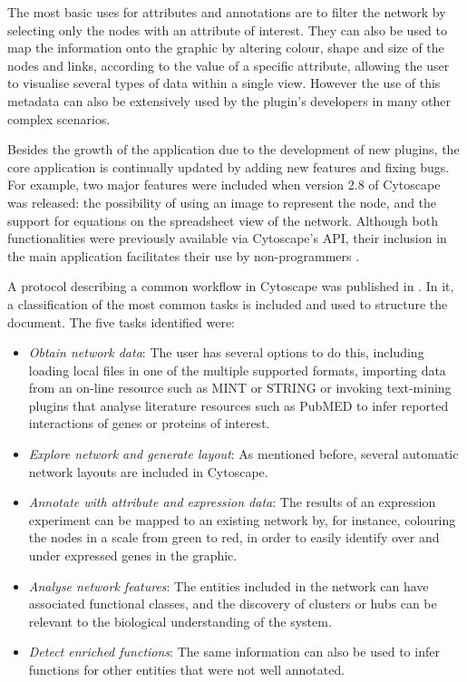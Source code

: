 The most basic uses for attributes and annotations are to filter the network by selecting only the nodes with an attribute of interest. They can also be used to map the information onto the graphic by altering colour, shape and size of the nodes and links, according to the value of a specific attribute, allowing the user to visualise several types of data within a single view. However the use of this metadata can also be extensively used by the plugin's developers in many other complex scenarios.

Besides the growth of the application due to the development of new plugins, the core application is continually updated by adding new features and fixing bugs. For example, two major features were included when version 2.8 of Cytoscape was released: the possibility of using an image to represent the node, and the support for equations on the spreadsheet view of the network. Although both functionalities were previously available via Cytoscape's API, their inclusion in the main application facilitates their use by non-programmers \cite{SMO2011}.

A protocol describing a common workflow in Cytoscape was published in \cite{CLI2007}. In it, a classification of the most common tasks is included and used to structure the document. The five tasks identified were: 
\begin{itemize}
\setlength\itemsep{-0.3em}
        \item \emph{Obtain network data}: The user has several options to do this, including loading local files in one of the multiple supported formats, importing data from an on-line resource such as MINT or STRING or invoking text-mining plugins that analyse literature resources such as PubMED to infer reported interactions of genes or proteins of interest.
        \item \emph{Explore network and generate layout}: As mentioned before, several automatic network layouts are included in Cytoscape.
        \item \emph{Annotate with attribute and expression data}: The results of an expression experiment can be mapped to an existing network by, for instance, colouring the nodes in a scale from green to red, in order to easily identify over and under expressed genes in the graphic.
        \item \emph{Analyse network features}: The entities included in the network can have associated functional classes, and the discovery of clusters or hubs can be relevant to the biological understanding of the system.
        \item \emph{Detect enriched functions}: The same information can also be used to infer functions for other entities that were not well annotated.
\end{itemize}

